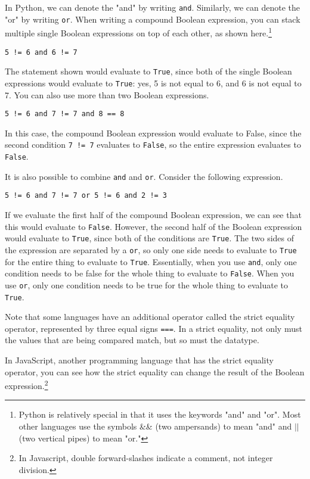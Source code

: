 In Python, we can denote the "and" by writing \verb|and|. Similarly, we can denote the "or" by writing \verb|or|. When writing a compound Boolean expression, you can stack multiple single Boolean expressions on top of each other, as shown here.\footnote{Python is relatively special in that it uses the keywords "and" and "or". Most other languages use the symbols \&\& (two ampersands) to mean "and" and $\vert \vert$ (two vertical pipes) to mean "or."}\par
\begin{lstlisting}[style=pippython]
5 != 6 and 6 != 7
\end{lstlisting}
The statement shown would evaluate to \verb|True|, since both of the single Boolean expressions would evaluate to \verb|True|: yes, 5 is not equal to 6, and 6 is not equal to 7. You can also use more than two Boolean expressions.\par
\begin{lstlisting}[style=pippython]
5 != 6 and 7 != 7 and 8 == 8
\end{lstlisting}
In this case, the compound Boolean expression would evaluate to False, since the second condition \verb|7 != 7| evaluates to \verb|False|, so the entire expression evaluates to \verb|False|.\par
It is also possible to combine \verb|and| and \verb#or#. Consider the following expression.
\begin{lstlisting}[style=pippython]
5 != 6 and 7 != 7 or 5 != 6 and 2 != 3
\end{lstlisting}
If we evaluate the first half of the compound Boolean expression, we can see that this would evaluate to \verb|False|. However, the second half of the Boolean expression would evaluate to \verb|True|, since both of the conditions are \verb|True|. The two sides of the expression are separated by a \verb#or#, so only one side needs to evaluate to \verb|True| for the entire thing to evaluate to \verb|True|. Essentially, when you use \verb|and|, only one condition needs to be false for the whole thing to evaluate to \verb|False|. When you use \verb#or#, only one condition needs to be true for the whole thing to evaluate to \verb|True|.\par
Note that some languages have an additional operator called the strict equality operator, represented by three equal signs \verb|===|. In a strict equality, not only must the values that are being compared match, but so must the datatype.\par
In JavaScript, another programming language that has the strict equality operator, you can see how the strict equality can change the result of the Boolean expression.\footnote{In Javascript, double forward-slashes indicate a comment, not integer division.}
